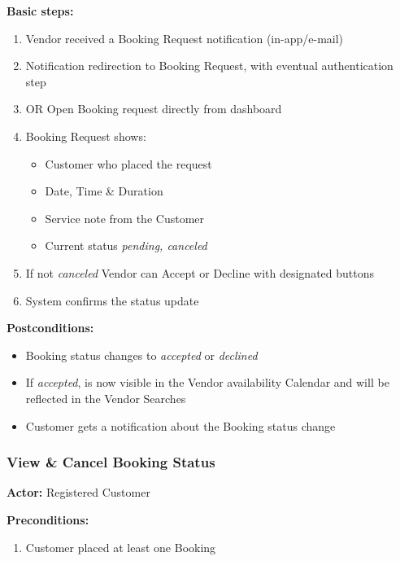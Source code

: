 \documentclass[11pt,a4paper]{article}
\begin{document}
\noindent \textbf{Basic steps:}
\begin{enumerate}
  \item Vendor received a Booking Request notification (in-app/e-mail)
  \item Notification redirection to Booking Request, with eventual
    authentication step
  \item OR Open Booking request directly from dashboard
  \item Booking Request shows:
    \begin{itemize}
      \item Customer who placed the request
      \item Date, Time \& Duration
      \item Service note from the Customer
      \item Current status \textit{pending, canceled}
    \end{itemize}
  \item If not \textit{canceled} Vendor can Accept or Decline with
    designated buttons
  \item System confirms the status update
\end{enumerate}

\noindent \textbf{Postconditions:}
\begin{itemize}
  \item Booking status changes to \textit{accepted} or \textit{declined}
  \item If \textit{accepted}, is now visible in the Vendor
    availability Calendar and will be reflected in the Vendor Searches
  \item Customer gets a notification about the Booking status change
\end{itemize}

\subsubsection{View \& Cancel Booking Status}

\textbf{Actor:} Registered Customer

\noindent \textbf{Preconditions:}
\begin{enumerate}
  \item Customer placed at least one Booking
\end{enumerate}
\end{document}
